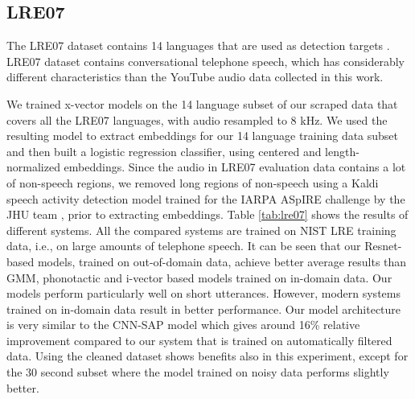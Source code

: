 \documentclass{article}
\begin{document}
\subsection{LRE07}

The LRE07 dataset contains 14 languages that are used as detection
targets \cite{nist2007}. LRE07 dataset contains conversational telephone speech, which has
considerably different characteristics than the YouTube audio data collected in this
work. 



We trained x-vector models on the 14 language subset of our scraped data that covers all the LRE07 languages, with audio resampled to 8 kHz. We used the resulting model to extract embeddings for our 
14 language training data subset  and
then built a logistic regression classifier, using centered and length-normalized embeddings. Since the audio in LRE07 evaluation data contains a lot of non-speech regions, we removed long regions of non-speech using a Kaldi speech activity detection model trained for the IARPA ASpIRE challenge by the JHU team \cite{peddinti2015jhu}, prior to extracting embeddings.
Table \ref{tab:lre07} shows the results of different systems.
All the compared systems are trained on NIST LRE training data, i.e., on large amounts of telephone speech.
It can be seen that our Resnet-based models, trained on out-of-domain data, achieve 
better average results than GMM, phonotactic and i-vector based models trained on in-domain data. Our models
perform particularly well on short utterances.
However, modern systems trained on in-domain data result in better performance. Our model
architecture is very similar to the CNN-SAP model \cite{cai2018exploring} which gives
around 16\% relative improvement compared to our system that is trained on automatically filtered data. Using the cleaned dataset shows benefits also in this experiment, except for the 30 second subset where the model trained on noisy data performs slightly better. 
\end{document}
